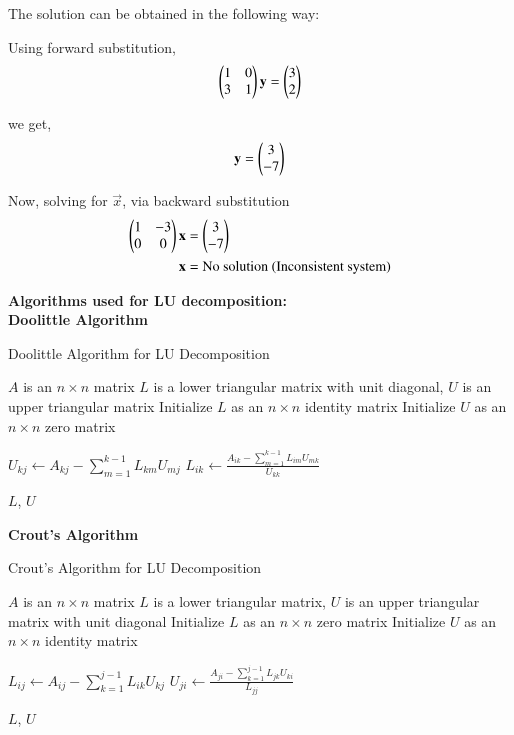 \documentclass[journal]{IEEEtran}
\numberwithin{equation}{enumi}
\numberwithin{figure}{enumi}
\begin{document}
The solution can be obtained in the following way:

Using forward substitution,
\begin{align}
    \begin{pmatrix}1 & 0\\ 3 & 1\end{pmatrix}\mathbf{y} = \begin{pmatrix}3 \\ 2\end{pmatrix}
\end{align}

we get,
\begin{align}
    \mathbf{y} = \begin{pmatrix}3 \\ -7\end{pmatrix}
\end{align}

Now, solving for $\vec{x}$, via backward substitution
\begin{align}
    \begin{pmatrix}1 & -3 \\ 0 & 0\end{pmatrix}\mathbf{x} &= \begin{pmatrix}3 \\ -7\end{pmatrix}\\
    \mathbf{x} &= \text{No solution (Inconsistent system)}
\end{align}

\newpage
\textbf{Algorithms used for LU decomposition:}\\

\textbf{Doolittle Algorithm}
\begin{algorithm}
\caption{Doolittle Algorithm for LU Decomposition}
\label{doolittle}
\begin{algorithmic}[1]
\Require $A$ is an $n \times n$ matrix
\Ensure $L$ is a lower triangular matrix with unit diagonal, $U$ is an upper triangular matrix
\State Initialize $L$ as an $n \times n$ identity matrix
\State Initialize $U$ as an $n \times n$ zero matrix

        \State $U_{kj} \gets A_{kj} - \sum_{m=1}^{k-1} L_{km} U_{mj}$
    \EndFor
        \State $L_{ik} \gets \frac{A_{ik} - \sum_{m=1}^{k-1} L_{im} U_{mk}}{U_{kk}}$
    \EndFor
\EndFor

\State \Return $L$, $U$
\end{algorithmic}
\end{algorithm}

\textbf{Crout's Algorithm}
\begin{algorithm}
\caption{Crout's Algorithm for LU Decomposition}
\label{crout}
\begin{algorithmic}[1]
\Require $A$ is an $n \times n$ matrix
\Ensure $L$ is a lower triangular matrix, $U$ is an upper triangular matrix with unit diagonal
\State Initialize $L$ as an $n \times n$ zero matrix
\State Initialize $U$ as an $n \times n$ identity matrix

        \State $L_{ij} \gets A_{ij} - \sum_{k=1}^{j-1} L_{ik} U_{kj}$
    \EndFor
        \State $U_{ji} \gets \frac{A_{ji} - \sum_{k=1}^{j-1} L_{jk} U_{ki}}{L_{jj}}$
    \EndFor
\EndFor

\State \Return $L$, $U$
\end{algorithmic}
\end{algorithm}
\end{document}
